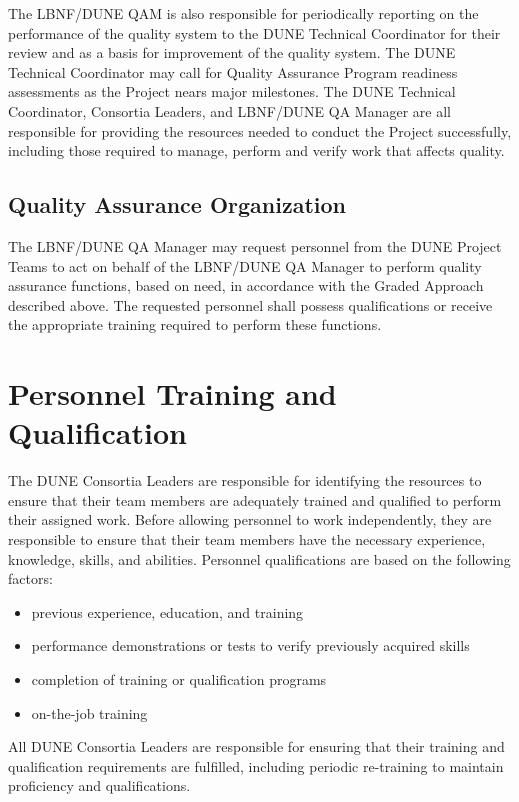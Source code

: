 The LBNF/DUNE QAM is also responsible for periodically reporting on
the performance of the quality system to the DUNE Technical
Coordinator for their review and as a basis for improvement of the
quality system. The DUNE Technical Coordinator may call for Quality
Assurance Program readiness assessments as the Project nears major
milestones. The DUNE Technical Coordinator, Consortia Leaders, and
LBNF/DUNE QA Manager are all responsible for providing the resources
needed to conduct the Project successfully, including those required
to manage, perform and verify work that affects quality.

\subsection{Quality Assurance Organization}

The LBNF/DUNE QA Manager may request personnel from the DUNE Project
Teams to act on behalf of the LBNF/DUNE QA Manager to perform quality
assurance functions, based on need, in accordance with the Graded
Approach described above. The requested personnel shall possess
qualifications or receive the appropriate training required to perform
these functions.

\section{Personnel Training and Qualification}

The DUNE Consortia Leaders are responsible for identifying the
resources to ensure that their team members are adequately trained and
qualified to perform their assigned work. Before allowing personnel to
work independently, they are responsible to ensure that their team
members have the necessary experience, knowledge, skills, and
abilities. Personnel qualifications are based on the following
factors:
\begin{itemize}
 \item previous experience, education, and training
 \item performance demonstrations or tests to verify previously acquired skills
 \item completion of training or qualification programs
 \item on-the-job training
\end{itemize}

All DUNE Consortia Leaders are responsible for ensuring that their
training and qualification requirements are fulfilled, including
periodic re-training to maintain proficiency and qualifications.


